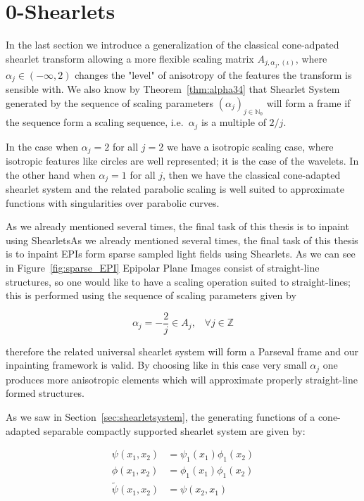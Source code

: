 \section{0-Shearlets}

In the last section we introduce a generalization of the classical cone-adpated shearlet transform allowing a more flexible scaling matrix $A_{j,\alpha_j,(\iota)}$, where $\alpha_j\in (-\infty,2)$ changes the "level" of anisotropy of the features the transform is sensible with. We also know by Theorem~\ref{thm:alpha34} that Shearlet System generated by the sequence of scaling parameters $(\alpha_j)_{j\in\mathbb{N}_0}$ will form a frame if the sequence form a scaling sequence, i.e.\ $\alpha_j$ is a multiple of $2/j$.

\bigskip

 In the case when $\alpha_j=2$ for all $j=2$ we have a isotropic scaling case, where isotropic features like circles are well represented; it is the case of the wavelets. In the other hand when $\alpha_j=1$ for all $j$, then we have the classical cone-adapted shearlet system and the related parabolic scaling is well suited to approximate functions with singularities over parabolic curves. 

\bigskip

As we already mentioned several times, the final task of this thesis is to inpaint using ShearletsAs we already mentioned several times, the final task of this thesis is to inpaint EPIs form sparse sampled light fields using Shearlets. As we can see in Figure~\ref{fig:sparse_EPI} Epipolar Plane Images consist of straight-line structures, so one would like to have a scaling operation suited to straight-lines; this is performed using the sequence of scaling parameters given by

$$
\alpha_j=-\frac{2}{j}\in A_j\textrm{,}\quad \forall j\in\mathbb{Z}
$$

therefore the related universal shearlet system will form a Parseval frame and our inpainting framework is valid. By choosing like in this case very small $\alpha_j$ one produces more anisotropic elements which will approximate properly straight-line formed structures.

\bigskip

As we saw in Section~\ref{sec:shearletsystem}, the generating functions of a cone-adapted separable compactly supported shearlet system are given by:

$$
\begin{aligned}
\psi(x_1,x_2)&=\psi_1(x_1)\phi_1(x_2)\\
\phi(x_1,x_2)&=\phi_1(x_1)\phi_1(x_2)\\
\tilde{\psi}(x_1,x_2)&=\psi(x_2,x_1)
\end{aligned}
$$

